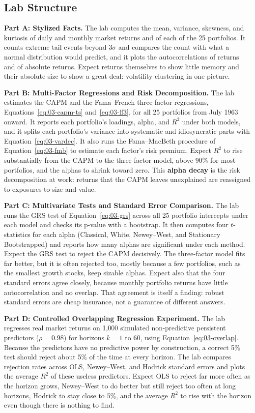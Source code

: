 \subsection*{Lab Structure}

\textbf{Part A: Stylized Facts.} The lab computes the mean, variance, skewness, and kurtosis of daily and monthly market returns and of each of the 25 portfolios. It counts extreme tail events beyond $3\sigma$ and compares the count with what a normal distribution would predict, and it plots the autocorrelations of returns and of absolute returns. Expect returns themselves to show little memory and their absolute size to show a great deal: volatility clustering in one picture.

\textbf{Part B: Multi-Factor Regressions and Risk Decomposition.} The lab estimates the CAPM and the Fama--French three-factor regressions, Equations~\eqref{eq:03-capm-ts} and~\eqref{eq:03-ff3}, for all 25 portfolios from July 1963 onward. It reports each portfolio's loadings, alpha, and $R^2$ under both models, and it splits each portfolio's variance into systematic and idiosyncratic parts with Equation~\eqref{eq:03-vardec}. It also runs the Fama--MacBeth procedure of Equation~\eqref{eq:03-fmb} to estimate each factor's risk premium. Expect $R^2$ to rise substantially from the CAPM to the three-factor model, above 90\% for most portfolios, and the alphas to shrink toward zero. This \textbf{alpha decay} is the risk decomposition at work: returns that the CAPM leaves unexplained are reassigned to exposures to size and value.

\textbf{Part C: Multivariate Tests and Standard Error Comparison.} The lab runs the GRS test of Equation~\eqref{eq:03-grs} across all 25 portfolio intercepts under each model and checks its p-value with a bootstrap. It then computes four $t$-statistics for each alpha (Classical, White, Newey--West, and Stationary Bootstrapped) and reports how many alphas are significant under each method. Expect the GRS test to reject the CAPM decisively. The three-factor model fits far better, but it is often rejected too, mostly because a few portfolios, such as the smallest growth stocks, keep sizable alphas. Expect also that the four standard errors agree closely, because monthly portfolio returns have little autocorrelation and no overlap. That agreement is itself a finding: robust standard errors are cheap insurance, not a guarantee of different answers.

\textbf{Part D: Controlled Overlapping Regression Experiment.} The lab regresses real market returns on 1,000 simulated non-predictive persistent predictors ($\rho=0.98$) for horizons $k=1$ to $60$, using Equation~\eqref{eq:03-overlap}. Because the predictors have no predictive power by construction, a correct 5\% test should reject about 5\% of the time at every horizon. The lab compares rejection rates across OLS, Newey--West, and Hodrick standard errors and plots the average $R^2$ of these useless predictors. Expect OLS to reject far more often as the horizon grows, Newey--West to do better but still reject too often at long horizons, Hodrick to stay close to 5\%, and the average $R^2$ to rise with the horizon even though there is nothing to find.


